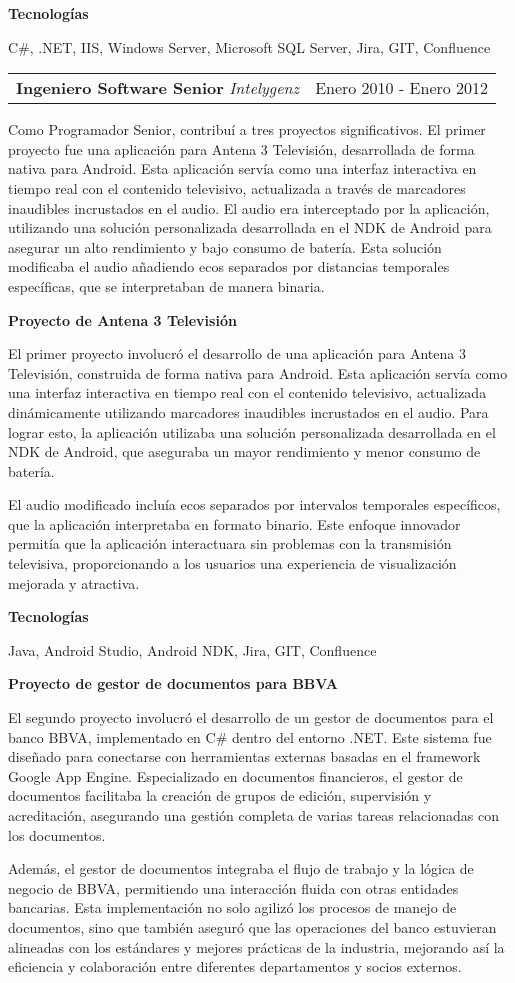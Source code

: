 \documentclass[a4paper,10pt]{article}
\makeatletter
\newcommand{\cvsubsection}[3]{
  \begin{tcolorbox}[colback=gray!20, colframe=gray!20, boxrule=0pt, arc=0mm, outer arc=0mm, width=\dimexpr\textwidth-2mm\relax, boxsep=0pt, left=2mm, right=2mm, top=2mm, bottom=2mm]
    \begin{tabular*}{\dimexpr\textwidth-6mm\relax}{p{0.7\textwidth} @{\extracolsep{\fill}} p{0.3\textwidth}}
      \raggedright
      \textbf{#1} \textit{#2} & \raggedleft \small{#3}
    \end{tabular*}
  \end{tcolorbox}
  \vspace{2mm}
}
\newcommand{\cvsubsubsection}[1]{
\begin{tcolorbox}[colback=gray!10, colframe=gray!10, boxrule=0pt, arc=0mm, outer arc=0mm, width=\textwidth, boxsep=0pt, left=4mm, right=4mm, top=1mm, bottom=1mm]
  \textbf{#1}
\end{tcolorbox}
\vspace{1mm}
}
\newcommand{\cvsubsubsubsection}[1]{
  \begin{tcolorbox}[colback=gray!5, colframe=gray!5, boxrule=0pt, arc=0mm, outer arc=0mm, width=\textwidth, boxsep=0pt, left=6mm, right=6mm, top=1mm, bottom=1mm]
    \textbf{#1}
  \end{tcolorbox}
  \vspace{1mm}
}
\makeatother
\begin{document}
\cvsubsubsubsection{Tecnologías}
C\#, .NET, IIS, Windows Server, Microsoft SQL Server, Jira, GIT, Confluence

\cvsubsection{Ingeniero Software Senior}{Intelygenz}{Enero 2010 - Enero 2012}
Como Programador Senior, contribuí a tres proyectos significativos. El primer proyecto fue una aplicación para Antena 3 Televisión, desarrollada de forma nativa para Android. Esta aplicación servía como una interfaz interactiva en tiempo real con el contenido televisivo, actualizada a través de marcadores inaudibles incrustados en el audio. El audio era interceptado por la aplicación, utilizando una solución personalizada desarrollada en el NDK de Android para asegurar un alto rendimiento y bajo consumo de batería. Esta solución modificaba el audio añadiendo ecos separados por distancias temporales específicas, que se interpretaban de manera binaria.

\cvsubsubsection{Proyecto de Antena 3 Televisión}
El primer proyecto involucró el desarrollo de una aplicación para Antena 3 Televisión, construida de forma nativa para Android. Esta aplicación servía como una interfaz interactiva en tiempo real con el contenido televisivo, actualizada dinámicamente utilizando marcadores inaudibles incrustados en el audio. Para lograr esto, la aplicación utilizaba una solución personalizada desarrollada en el NDK de Android, que aseguraba un mayor rendimiento y menor consumo de batería.

El audio modificado incluía ecos separados por intervalos temporales específicos, que la aplicación interpretaba en formato binario. Este enfoque innovador permitía que la aplicación interactuara sin problemas con la transmisión televisiva, proporcionando a los usuarios una experiencia de visualización mejorada y atractiva.

\cvsubsubsubsection{Tecnologías}
Java, Android Studio, Android NDK, Jira, GIT, Confluence

\cvsubsubsection{Proyecto de gestor de documentos para BBVA}
El segundo proyecto involucró el desarrollo de un gestor de documentos para el banco BBVA, implementado en C\# dentro del entorno .NET. Este sistema fue diseñado para conectarse con herramientas externas basadas en el framework Google App Engine. Especializado en documentos financieros, el gestor de documentos facilitaba la creación de grupos de edición, supervisión y acreditación, asegurando una gestión completa de varias tareas relacionadas con los documentos.

Además, el gestor de documentos integraba el flujo de trabajo y la lógica de negocio de BBVA, permitiendo una interacción fluida con otras entidades bancarias. Esta implementación no solo agilizó los procesos de manejo de documentos, sino que también aseguró que las operaciones del banco estuvieran alineadas con los estándares y mejores prácticas de la industria, mejorando así la eficiencia y colaboración entre diferentes departamentos y socios externos.
\end{document}
